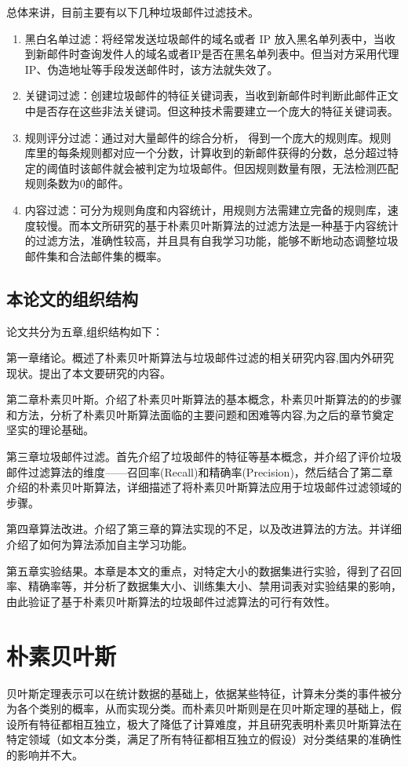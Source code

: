 \documentclass[UTF8,zihao=-4]{ctexart}
\begin{document}
总体来讲，目前主要有以下几种垃圾邮件过滤技术。
\renewcommand\labelenumi{(\theenumi)}
\begin{enumerate}
	\item 黑白名单过滤：将经常发送垃圾邮件的域名或者 IP 放入黑名单列表中，当收到新邮件时查询发件人的域名或者IP是否在黑名单列表中。但当对方采用代理IP、伪造地址等手段发送邮件时，该方法就失效了。
	\item 关键词过滤：创建垃圾邮件的特征关键词表，当收到新邮件时判断此邮件正文中是否存在这些非法关键词。但这种技术需要建立一个庞大的特征关键词表。
	\item 规则评分过滤：通过对大量邮件的综合分析， 得到一个庞大的规则库。规则库里的每条规则都对应一个分数，计算收到的新邮件获得的分数，总分超过特定的阈值时该邮件就会被判定为垃圾邮件。但因规则数量有限，无法检测匹配规则条数为0的邮件。
	\item 内容过滤：可分为规则角度和内容统计，用规则方法需建立完备的规则库，速度较慢。而本文所研究的基于朴素贝叶斯算法的过滤方法是一种基于内容统计的过滤方法，准确性较高，并且具有自我学习功能，能够不断地动态调整垃圾邮件集和合法邮件集的概率。
\end{enumerate}

\subsection{本论文的组织结构}
	论文共分为五章,组织结构如下：
	
	第一章绪论。概述了朴素贝叶斯算法与垃圾邮件过滤的相关研究内容,国内外研究现状。提出了本文要研究的内容。
	
	第二章朴素贝叶斯。介绍了朴素贝叶斯算法的基本概念，朴素贝叶斯算法的的步骤和方法，分析了朴素贝叶斯算法面临的主要问题和困难等内容,为之后的章节奠定坚实的理论基础。
	
	第三章垃圾邮件过滤。首先介绍了垃圾邮件的特征等基本概念，并介绍了评价垃圾邮件过滤算法的维度——召回率(Recall)和精确率(Precision)，然后结合了第二章介绍的朴素贝叶斯算法，详细描述了将朴素贝叶斯算法应用于垃圾邮件过滤领域的步骤。
	
	第四章算法改进。介绍了第三章的算法实现的不足，以及改进算法的方法。并详细介绍了如何为算法添加自主学习功能。
	
	第五章实验结果。本章是本文的重点，对特定大小的数据集进行实验，得到了召回率、精确率等，并分析了数据集大小、训练集大小、禁用词表对实验结果的影响，由此验证了基于朴素贝叶斯算法的垃圾邮件过滤算法的可行有效性。

\section{朴素贝叶斯}
	贝叶斯定理表示可以在统计数据的基础上，依据某些特征，计算未分类的事件被分为各个类别的概率，从而实现分类。而朴素贝叶斯则是在贝叶斯定理的基础上，假设所有特征都相互独立，极大了降低了计算难度，并且研究表明朴素贝叶斯算法在特定领域（如文本分类，满足了所有特征都相互独立的假设）对分类结果的准确性的影响并不大。
	
\end{document}
